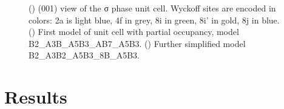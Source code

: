 \documentclass[superscriptaddress, 12pt]{revtex4-2}%
\begin{document}
\begin{figure}

  \caption{\protect\label{fig:PartialOccupancies}
    () (001) view of the σ phase unit cell. Wyckoff sites are encoded in colors: 2a is light blue,
    4f in grey, 8i in green, 8i' in gold, 8j in blue. 
    () First model of unit cell with partial occupancy, model B2\_A3B\_A5B3\_AB7\_A5B3.
    () Further simplified model B2\_A3B2\_A5B3\_8B\_A5B3.
  }

\end{figure}

\section{Results}
\end{document}
